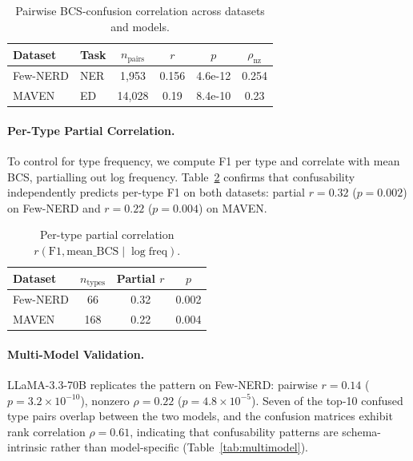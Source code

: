 \documentclass[11pt,a4paper]{article}
\begin{document}
\begin{table}[t]
\centering
\small
\caption{Pairwise BCS-confusion correlation across datasets and models.}
\label{tab:pairwise}
\begin{tabular}{llcccc}
\toprule
\textbf{Dataset} & \textbf{Task} & \textbf{$n_{\text{pairs}}$} & \textbf{$r$} & \textbf{$p$} & \textbf{$\rho_{\text{nz}}$} \\
\midrule
Few-NERD & NER & 1{,}953 & 0.156 & 4.6e-12 & 0.254 \\
MAVEN    & ED  & 14{,}028 & 0.19 & 8.4e-10 & 0.23 \\
\bottomrule
\end{tabular}
\end{table}

\paragraph{Per-Type Partial Correlation.}
To control for type frequency, we compute F1 per type and correlate with mean BCS, partialling out log frequency.
Table~\ref{tab:partial} confirms that confusability independently predicts per-type F1 on both datasets: partial $r{=}0.32$ ($p{=}0.002$) on Few-NERD and $r{=}0.22$ ($p{=}0.004$) on MAVEN.

\begin{table}[t]
\centering
\small
\caption{Per-type partial correlation $r(\text{F1}, \text{mean\_BCS} \mid \log\text{freq})$.}
\label{tab:partial}
\begin{tabular}{lccc}
\toprule
\textbf{Dataset} & \textbf{$n_{\text{types}}$} & \textbf{Partial $r$} & \textbf{$p$} \\
\midrule
Few-NERD & 66  & 0.32 & 0.002 \\
MAVEN    & 168 & 0.22 & 0.004 \\
\bottomrule
\end{tabular}
\end{table}

\paragraph{Multi-Model Validation.}
LLaMA-3.3-70B replicates the pattern on Few-NERD: pairwise $r{=}0.14$ ($p{=}3.2{\times}10^{-10}$), nonzero $\rho{=}0.22$ ($p{=}4.8{\times}10^{-5}$).
Seven of the top-10 confused type pairs overlap between the two models, and the confusion matrices exhibit rank correlation $\rho{=}0.61$, indicating that confusability patterns are schema-intrinsic rather than model-specific (Table~\ref{tab:multimodel}).
\end{document}
